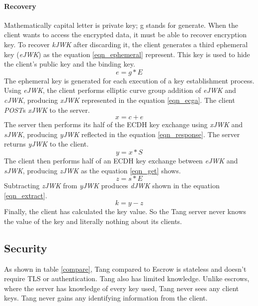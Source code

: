 \paragraph{Recovery}
Mathematically capital letter is private key; g stands for generate.
When the client wants to access the encrypted data, it must be able to recover encryption key.
To recover {\it kJWK} after discarding it, the client generates a third ephemeral key ({\it eJWK}) as the equation \ref{eqn_ephemeral} represent.
This key is used to hide the client's public key and the binding key.
\begin{equation}\label{eqn_ephemeral}
    e = g * E
\end{equation}
The ephemeral key is generated for each execution of a key establishment process.
Using {\it eJWK}, the client performs elliptic curve group addition of {\it eJWK} and {\it cJWK}, producing {\it xJWK} represented in the equation \ref{eqn_ecga}.
The client {\it POST}s {\it xJWK} to the server.
\begin{equation}\label{eqn_ecga}
    x = c + e
\end{equation}
The server then performs its half of the ECDH key exchange using {\it xJWK} and {\it sJWK}, producing {\it yJWK} reflected in the equation \ref{eqn_response}. The server returns {\it yJWK} to the client.
\begin{equation}\label{eqn_response}
    y = x * S
\end{equation}
The client then performs half of an ECDH key exchange between {\it eJWK} and {\it sJWK}, producing {\it zJWK} as the equation \ref{eqn_get} shows.
\begin{equation}\label{eqn_get}
    z = s * E
\end{equation}
Subtracting {\it zJWK} from {\it yJWK} produces {\it dJWK} shown in the equation \ref{eqn_extract}.
\begin{equation}\label{eqn_extract}
    k = y - z
\end{equation}
Finally, the client has calculated the key value.
So the Tang server never knows the value of the key and literally nothing about its clients.



\subsection{Security}

As shown in table \ref{compare}, Tang compared to Escrow is stateless and doesn't require TLS or authentication.
Tang also has limited knowledge.
Unlike escrows, where the server has knowledge of every key used, Tang never sees any client keys.
Tang never gains any identifying information from the client.

